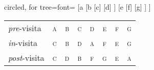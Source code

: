 
\ifstandalone

\begin{algorithm}[H]
\fi
\begin{minipage}[t]{.5\linewidth}

\BlankLine
{}

\end{minipage}%
\begin{minipage}[t]{.5\linewidth}

\ifFigureOfAlgo
\begin{minipage}[t][5cm]{.5\linewidth}
	\centering
	\vfill
	\begin{forest} circled, for tree={font=\footnotesize\scshape}
		[a
			[b
				[c]
				[d]
			]
			[e
				[f]
				[g]
			]
		]
	\end{forest}
	\vfill
	\begin{tabular}{@{} l *{7}{ >{\scshape}c @{} } @{}}\small
		\emph{pre}-visita  & a & b & c & d & e & f & g \\
		\emph{in}-visita   & c & b & d & a & f & e & g \\
		\emph{post}-visita & c & d & b & f & g & e & a \\
	\end{tabular}
\end{minipage}
\fi

\end{minipage}
\ifstandalone
\end{algorithm}

\fi
